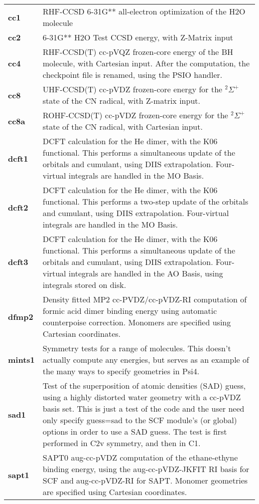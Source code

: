 \begin{tabular*}{\textwidth}[tb]{p{}p{}}
{\bf cc1} &  RHF-CCSD 6-31G** all-electron optimization of the H2O molecule\\
{\bf cc2} &  6-31G** H2O Test CCSD energy, with Z-Matrix input\\
{\bf cc4} &  RHF-CCSD(T) cc-pVQZ frozen-core energy of the BH molecule, with Cartesian input. After the computation, the checkpoint file is renamed, using the PSIO handler.\\
{\bf cc8} &  UHF-CCSD(T) cc-pVDZ frozen-core energy for the $^2\Sigma^+$ state of the CN radical, with Z-matrix input.\\
{\bf cc8a} &  ROHF-CCSD(T) cc-pVDZ frozen-core energy for the $^2\Sigma^+$ state of the CN radical, with Cartesian input.\\
{\bf dcft1} &  DCFT calculation for the He dimer, with the K06 functional. This performs a simultaneous update of the orbitals and cumulant, using DIIS extrapolation. Four-virtual integrals are handled in the MO Basis.\\
{\bf dcft2} &  DCFT calculation for the He dimer, with the K06 functional. This performs a two-step update of the orbitals and cumulant, using DIIS extrapolation. Four-virtual integrals are handled in the MO Basis.\\
{\bf dcft3} &  DCFT calculation for the He dimer, with the K06 functional. This performs a simultaneous update of the orbitals and cumulant, using DIIS extrapolation. Four-virtual integrals are handled in the AO Basis, using integrals stored on disk.\\
{\bf dfmp2} &  Density fitted MP2 cc-PVDZ/cc-pVDZ-RI computation of formic acid dimer binding energy using automatic counterpoise correction.  Monomers are specified using Cartesian coordinates.\\
{\bf mints1} &  Symmetry tests for a range of molecules.  This doesn't actually compute any energies, but serves as an example of the many ways to specify geometries in Psi4.\\
{\bf sad1} &  Test of the superposition of atomic densities (SAD) guess, using a highly distorted water geometry with a cc-pVDZ basis set.  This is just a test of the code and the user need only specify guess=sad to the SCF module's (or global) options in order to use a SAD guess. The test is first performed in C2v symmetry, and then in C1.\\
{\bf sapt1} &  SAPT0 aug-cc-pVDZ computation of the ethane-ethyne binding energy, using the aug-cc-pVDZ-JKFIT RI basis for SCF and aug-cc-pVDZ-RI for SAPT.  Monomer geometries are specified using Cartesian coordinates.\\

\end{tabular*}
